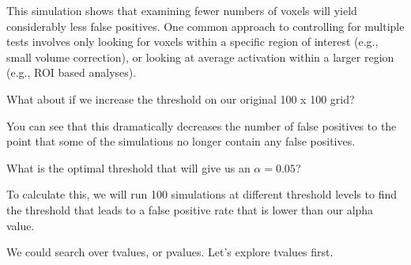 \documentclass[letterpaper,10pt,english]{sphinxmanual}
\begin{document}
\noindent{}

This simulation shows that examining fewer numbers of voxels will yield considerably less false positives. One common approach to controlling for multiple tests involves only looking for voxels within a specific region of interest (e.g., small volume correction), or looking at average activation within a larger region (e.g., ROI based analyses).

What about if we increase the threshold on our original 100 x 100 grid?

\begin{sphinxVerbatim}[commandchars=\\\{\}]
  
   
  
\end{sphinxVerbatim}

\noindent{}

You can see that this dramatically decreases the number of false positives to the point that some of the simulations no longer contain any false positives.

What is the optimal threshold that will give us an \(\alpha=0.05\)?

To calculate this, we will run 100 simulations at different threshold levels to find the threshold that leads to a false positive rate that is lower than our alpha value.

We could search over t\sphinxhyphen{}values, or p\sphinxhyphen{}values. Let’s explore t\sphinxhyphen{}values first.
\end{document}
